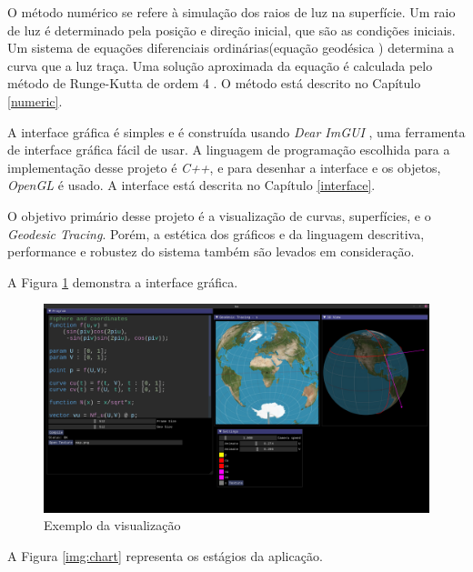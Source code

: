 O método numérico se refere à simulação dos raios de luz na superfície.
Um raio de luz é determinado pela posição e direção inicial, que são as condições iniciais.
Um sistema de equações diferenciais ordinárias(equação geodésica \cite{GeomDiff:1})
determina a curva que a luz traça.
Uma solução aproximada da equação é calculada pelo método de Runge-Kutta de ordem 4 \cite{Anal:1}.
O método está descrito no Capítulo \ref{numeric}.

A interface gráfica é simples e é construída usando \textit{Dear ImGUI} \cite{ImGui},
uma ferramenta de interface gráfica fácil de usar.
A linguagem de programação escolhida para a implementação desse projeto é \textit{C++},
e para desenhar a interface e os objetos, \textit{OpenGL} é usado.
A interface está descrita no Capítulo \ref{interface}.

O objetivo primário desse projeto é a visualização de curvas, superfícies, e o \textit{Geodesic Tracing}.
Porém, a estética dos gráficos e da linguagem descritiva, performance
e robustez do sistema também são levados em consideração.

A Figura \ref{img:preview} demonstra a interface gráfica.

\begin{figure}[!ht]
    \centering
    \includegraphics[width=\linewidth]{preview.png}
    \caption{Exemplo da visualização}
    \label{img:preview}
\end{figure}

\newpage

A Figura \ref{img:chart} representa os estágios da aplicação.

